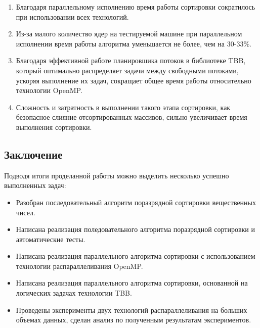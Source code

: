 \documentclass{report}
\begin{document}
\begin{enumerate} 
\item Благодаря параллельному исполнению время работы сортировки сократилось при использовании всех технологий.
\item Из-за малого количество ядер на тестируемой машине при параллельном исполнении время работы алгоритма уменьшается не более, чем на 30-33\%.
\item Благодаря эффективной работе планировшика потоков в библиотеке TBB, который оптимально распределяет задачи между свободными потоками, ускоряя
выполнение их задач, сокращает общее время работы относительно технологии OpenMP.
\item Сложность и затратность в выполнении такого этапа сортировки, как безопасное слияние отсортированных массивов, сильно увеличивает время выполнения сортировки.

\end{enumerate} 
 
\newpage

\begin{center}\section*{Заключение}\end{center}

Подводя итоги проделанной работы можно выделить несколько успешно выполненных задач:

\begin{itemize}
\item Разобран последовательный алгоритм поразрядной сортировки вещественных чисел.
\item Написана реализация поледовательного алгоритма поразрядной сортировки и автоматические тесты.
\item Написана реализация параллельного алгоритма сортировки с использованием технологии распараллеливания OpenMP.
\item Написана реализация параллельного алгоритма сортировки, основанной на логических задачах технологии TBB.
\item Проведены эксперименты двух технологий распараллеливания на больших объемах данных, сделан анализ по полученным результатам экспериментов.

\end{itemize} 

\newpage
\end{document}
